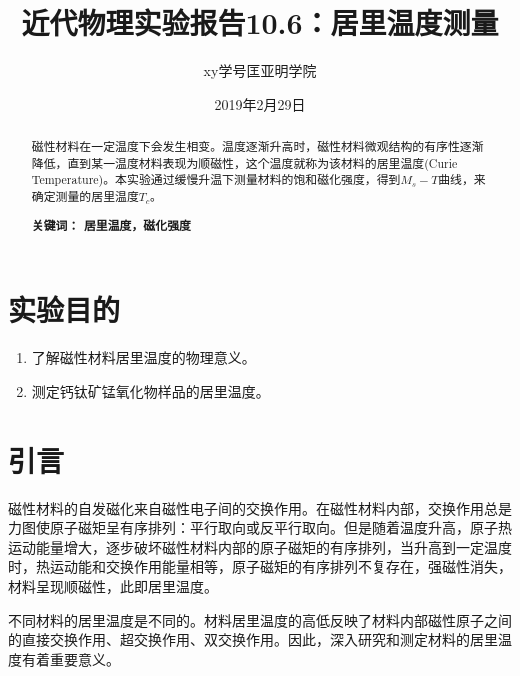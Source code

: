 \documentclass[a4paper]{article}
\title{近代物理实验报告10.6：居里温度测量}
\author{xy\quad 学号\quad 匡亚明学院}
\date{2019年2月29日}
\providecommand{\keywords}[1]{\textbf{关键词： #1}}
\begin{document}
\maketitle


\begin{abstract}
    磁性材料在一定温度下会发生相变。温度逐渐升高时，磁性材料微观结构的有序性逐渐降低，直到某一温度材料表现为顺磁性，这个温度就称为该材料的居里温度(Curie Temperature)。本实验通过缓慢升温下测量材料的饱和磁化强度，得到$M_s - T$曲线，来确定测量的居里温度$T_c$。

    \keywords{居里温度，磁化强度}
\end{abstract}

\section{实验目的}
\begin{enumerate}
    \item 了解磁性材料居里温度的物理意义。
    \item 测定钙钛矿锰氧化物样品的居里温度。
\end{enumerate}

\section{引言}
磁性材料的自发磁化来自磁性电子间的交换作用。在磁性材料内部，交换作用总是力图使原子磁矩呈有序排列：平行取向或反平行取向。但是随着温度升高，原子热运动能量增大，逐步破坏磁性材料内部的原子磁矩的有序排列，当升高到一定温度时，热运动能和交换作用能量相等，原子磁矩的有序排列不复存在，强磁性消失，材料呈现顺磁性，此即居里温度。

不同材料的居里温度是不同的。材料居里温度的高低反映了材料内部磁性原子之间的直接交换作用、超交换作用、双交换作用。因此，深入研究和测定材料的居里温度有着重要意义。
\end{document}
